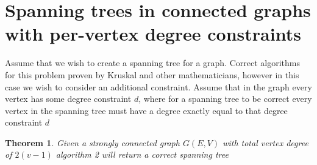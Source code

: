 \documentclass{article}
\newtheorem{theorem}{Theorem}
\begin{document}
\section{Spanning trees in connected graphs with per-vertex degree constraints}
Assume that we wish to create a spanning tree for a graph. Correct algorithms for this problem proven by Kruskal and other
mathematicians, however in this case we wish to consider an additional constraint. Assume that in the graph every vertex has some degree constraint $d$,
where for a spanning tree to be correct every vertex in the spanning tree must have a degree exactly equal to that degree constraint $d$
 
\begin{theorem}
Given a strongly connected graph $G(E,V)$ with total vertex degree of $2(v-1)$ algorithm 2 will return a correct spanning tree
\end{theorem}
\end{document}

